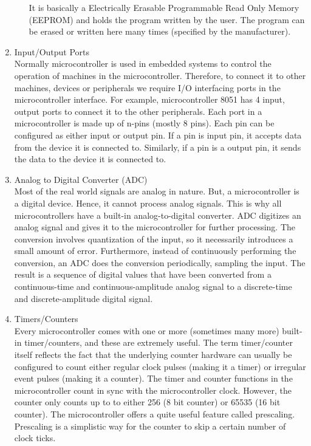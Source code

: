 \begin{enumerate}
\begin{enumerate}
It is basically a Electrically Erasable Programmable Read Only Memory (EEPROM) and holds the program written by the user. The program can be erased or written here many times (specified by the manufacturer).\\
\end{enumerate}
\item Input/Output Ports\\
Normally microcontroller is used in embedded systems to control the operation of machines in the microcontroller. Therefore, to connect it to other machines, devices or peripherals we require I/O interfacing ports in the microcontroller interface. For example, microcontroller 8051 has 4 input, output ports to connect it to the other peripherals. Each port in a microcontroller is made up of n-pins (mostly 8 pins). Each pin can be configured as either input or output pin. If a pin is input pin, it accepts data from the device it is connected to. Similarly, if a pin is a output pin, it sends the data to the device it is connected to.
\item Analog to Digital Converter (ADC)\\
Most of the real world signals are analog in nature. But, a microcontroller is a digital device. Hence, it cannot process analog signals. This is why all microcontrollers have a built-in analog-to-digital converter. ADC digitizes an analog signal and gives it to the microcontroller for further processing. The conversion involves quantization of the input, so it necessarily introduces a small amount of error. Furthermore, instead of continuously performing the conversion, an ADC does the conversion periodically, sampling the input. The result is a sequence of digital values that have been converted from a continuous-time and continuous-amplitude analog signal to a discrete-time and discrete-amplitude digital signal.
\item Timers/Counters\\
Every microcontroller comes with one or more (sometimes many more) built-in timer/counters, and these are extremely useful. The term timer/counter itself reflects the fact that the underlying counter hardware can usually be configured to count either regular clock pulses (making it a timer) or irregular event pulses (making it a counter). The timer and counter functions in the microcontroller count in sync with the microcontroller clock. However, the counter only counts up to to either 256 (8 bit counter) or 65535 (16 bit counter). The microcontroller offers a quite useful feature called prescaling. Prescaling is a simplistic way for the counter to skip a certain number of clock ticks.\\

\end{enumerate}
